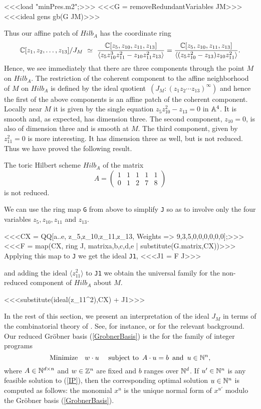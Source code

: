 <<<load "minPres.m2";>>>
<<<G = removeRedundantVariables JM>>>
<<<ideal gens gb(G JM)>>>

Thus our affine patch of $Hilb_A$ has the coordinate ring 
$$\mathbb{C}[z_1,z_2,\ldots,z_{13}]/J_M \,\, \simeq \,\,
\frac{\mathbb{C}[z_5,z_{10},z_{11},z_{13}]}{ \langle z_5 z_{{10}}^3 z_{11}^2 -
  z_{10}z_{11}^2 z_{13} \rangle} = \frac{\mathbb{C}[z_5,z_{10},z_{11},z_{13}]}
{\langle (z_5 z_{10}^2 -z_{13}) z_{10}z_{11}^2 \rangle}.$$
Hence, we see immediately that there are three
components through the point $M$ on $Hilb_A$. The restriction of the
coherent component to the affine neighborhood of $M$ on $Hilb_A$ is
defined by the ideal quotient $\, (J_M : (z_1 z_2 \cdots
z_{13})^\infty) $ and hence the first of the above components 
is an affine patch of the coherent component. Locally near $M$ it is  
given by the single equation $z_5 z_{10}^2 - z_{13} = 0$ in $\mathbb{A}^4$. 
It is smooth and, as expected, has dimension three. The second
component, $z_{10} = 0$, is also of dimension three and is smooth at $M$.
The third component, given by $z_{11}^2 = 0$ is more interesting.  It
has dimension three as well, but is not reduced.  Thus we have proved
the following result.

\begin{proposition}
The toric Hilbert scheme $Hilb_A$ of the matrix 
$$A = \left( \begin{matrix}
           1 & 1 & 1 & 1 & 1  \\ 
           0 & 1 & 2 & 7 & 8 
\end{matrix} \right)$$
is not reduced.
\end{proposition}

We can use the ring map {\tt G} from above to simplify {\tt J} so as
to involve only the four variables $z_5, z_{10},z_{11}$ and $z_{13}$.

<<<CX = QQ[a..e, z_5,z_10,z_11,z_13, Weights =>
      {9,3,5,0,0,0,0,0,0}];>>> 
<<<F = map(CX, ring J, matrix{{a,b,c,d,e}} | 
            substitute(G.matrix,CX))>>>
Applying this map to {\tt J} we get the ideal {\tt J1}, 
<<<J1 = F J>>>

\noindent and adding the ideal $\langle z_{11}^2 \rangle$ to {\tt J1} 
we obtain the universal family for the non-reduced component of
$Hilb_A$ about $M$. 

<<<substitute(ideal(z_11^2),CX) + J1>>>

In the rest of this section, we present an interpretation of
the ideal $J_M$ in terms of the combinatorial theory
of {\it {}}. See, for instance, 
\cite[\S 4]{HS:St2} or \cite{HS:Tho} for 
the relevant background. Our reduced Gr\"obner basis 
(\ref{GrobnerBasis}) is the {\it {}} for
the family of integer programs
\begin{equation}
\label{IP}
{\rm Minimize} \quad
w \cdot u \,\,\quad
{\rm subject} \,\, {\rm to } \,\,\,
A \cdot u = b   \,\,\, {\rm and}
 \,\,\,u \in \mathbb{N}^n, 
\end{equation}
where $A \in \mathbb{N}^{d \times n}$ and $w
\in \mathbb{Z}^n$ are fixed and $b$ ranges over $\mathbb{N}^d$.
If $u' \in \mathbb{N}^n$ is any feasible solution
to (\ref{IP}), then the corresponding optimal solution
$u \in \mathbb{N}^n$ is computed as follows: the monomial
$x^u $ is the unique normal form of $x^{u'}$ modulo
the Gr\"obner basis (\ref{GrobnerBasis}).

